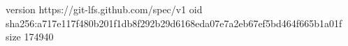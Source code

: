 version https://git-lfs.github.com/spec/v1
oid sha256:a717e117f480b201f1db8f292b29d6168eda07e7a2eb67ef5bd464f665b1a01f
size 174940
